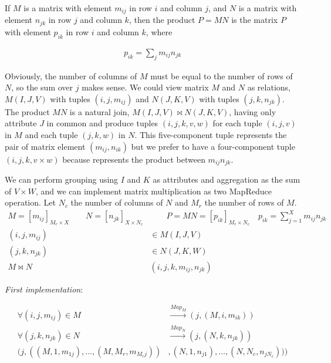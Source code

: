 If $M$ is a matrix with element $m_{ij}$ in row $i$ and column $j$, and $N$ is a matrix with element $n_{jk}$ in row $j$ and column $k$, then the product $P = MN$ is the matrix $P$ with element $p_{ik}$ in row $i$ and column $k$, where

\begin{equation*}
    \begin{split}
        p_{ik} = \sum_{j} m_{ij}n_{jk}
    \end{split}
\end{equation*}

Obviously, the number of columns of $M$ must be equal to the number of rows of $N$, so the sum over $j$ makes sense. We could view matrix $M$ and $N$ as relations, $M(I, J, V)$ with tuples $(i, j, m_{ij})$ and $N(J, K, V)$ with tuples $(j, k, n_{jk})$. The product $MN$ is a natural join, $M(I, J, V) \bowtie N(J, K, V)$, having only attribute $J$ in common and produce tuples $(i, j, k, v, w)$ for each tuple $(i, j, v)$ in $M$ and each tuple $(j, k, w)$ in $N$. This five-component tuple represents the pair of matrix element $(m_{ij}, n_{ik})$ but we prefer to have a four-component tuple $(i, j, k, v \times w)$ because represents the product between $m_{ij}n_{jk}$.

We can perform grouping using $I$ and $K$ as attributes and aggregation as the sum of $V \times W$, and we can implement matrix multiplication as two MapReduce operation.
Let $N_c$ the number of columns of $N$ and $M_r$ the number of rows of $M$.
\begin{equation*}
    \begin{split}
        M=[m_{ij}]_{M_r \times X} \qquad N=[n_{jk}]_{X \times N_c} & \qquad P=MN=[p_{ik}]_{M_r \times N_c}\quad p_{ik} =\sum_{j=1}^X m_{ij}n_{jk}\\
        (i, j, m_{ij}) & \in M(I,J,V)\\
        (j, k, n_{jk}) & \in N(J,K,W)\\
        M\bowtie N & (i,j,k, m_{ij}, n_{jk})
    \end{split}
\end{equation*}

\textit{First implementation}:

\begin{equation*}
    \begin{split}
                     \forall (i,j,m_{ij}) \in M & \xrightarrow{Map_M} (j, (M,i,m_{ik}))\\
                     \forall (j,k,n_{jk}) \in N & \xrightarrow{Map_N} (j, (N,k,n_{jk}))\\  
        (j, ((M,1,m_{1j}), \dots, (M,M_r,m_{M_rj})) & , (N,1,n_{j1}), \dots, (N,N_c,n_{jN_c})))
    \end{split}
\end{equation*}

